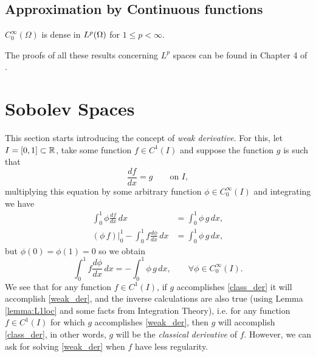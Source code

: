 \subsection*{Approximation by Continuous functions}
\begin{theorem}
$C_0^\infty(\Omega)$ is dense in ${L^{p}(\Omega)}$ for $1\leq p <\infty$.
\end{theorem}
The proofs of all these results concerning $L^p$ spaces can be found in Chapter 4 of \cite{brezis2011}.

\section{Sobolev Spaces} This section starts introducing the concept of \emph{weak derivative}. For this, let $I\nobreak=\nobreak[0,1]\nobreak\subset\nobreak \mathbb{R}$, take some function $f\in C^1\left(I\right)$ and suppose the function $g$ is such that 
\begin{equation}
\frac{df}{dx}=g\qquad \text{on }I,\label{eq:class_der}
\end{equation}
multiplying this equation by some arbitrary function $\phi \in C_0^\infty(I)$ and integrating we have 
\begin{align*}
\int_0^1 \phi \frac{df}{dx}\,dx&=\int_0^1 \phi\,g\,dx, \\
\left(\phi\,f\right)\left.\right|_0^1-\int_0^1 f \frac{d\phi}{dx}\,dx&=\int_0^1 \phi\,g\,dx, 
\end{align*}
but $\phi(0)=\phi(1)=0$ so we obtain
\begin{equation}
\int_0^1 f \frac{d\phi}{dx}\,dx=-\int_0^1 \phi\,g\,dx,\qquad \forall \phi \in C_0^\infty(I).\label{eq:weak_der}
\end{equation}
We see that for any function $f\in C^1(I)$, if $g$ accomplishes \eqref{class_der} it will accomplish \eqref{weak_der}, and the inverse calculations are also true (using Lemma \ref{lemma:L1loc} and some facts from Integration Theory), i.e. for any function $f\in C^1(I)$ for which $g$ accomplishes \eqref{weak_der}, then $g$ will accomplish \eqref{class_der}, in other words, $g$ will be the \emph{classical derivative} of $f$. However, we can ask for solving \eqref{weak_der} when $f$ have less regularity.

